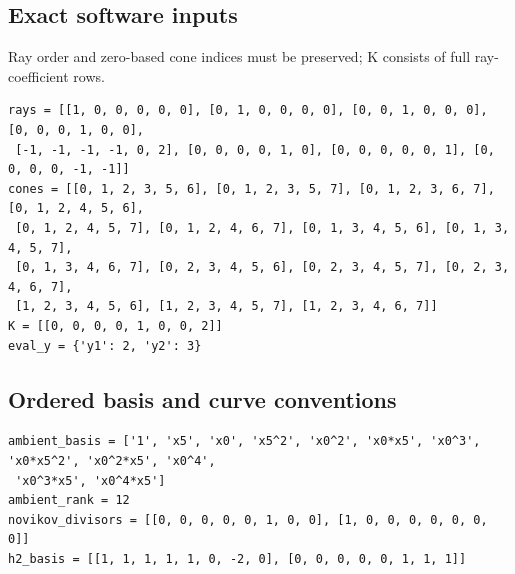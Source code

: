 \documentclass[10pt,a4paper]{article}
\begin{document}
\subsection*{Exact software inputs}
Ray order and zero-based cone indices must be preserved; K consists of full ray-coefficient rows.
\begin{lstlisting}
rays = [[1, 0, 0, 0, 0, 0], [0, 1, 0, 0, 0, 0], [0, 0, 1, 0, 0, 0], [0, 0, 0, 1, 0, 0],
 [-1, -1, -1, -1, 0, 2], [0, 0, 0, 0, 1, 0], [0, 0, 0, 0, 0, 1], [0, 0, 0, 0, -1, -1]]
cones = [[0, 1, 2, 3, 5, 6], [0, 1, 2, 3, 5, 7], [0, 1, 2, 3, 6, 7], [0, 1, 2, 4, 5, 6],
 [0, 1, 2, 4, 5, 7], [0, 1, 2, 4, 6, 7], [0, 1, 3, 4, 5, 6], [0, 1, 3, 4, 5, 7],
 [0, 1, 3, 4, 6, 7], [0, 2, 3, 4, 5, 6], [0, 2, 3, 4, 5, 7], [0, 2, 3, 4, 6, 7],
 [1, 2, 3, 4, 5, 6], [1, 2, 3, 4, 5, 7], [1, 2, 3, 4, 6, 7]]
K = [[0, 0, 0, 0, 1, 0, 0, 2]]
eval_y = {'y1': 2, 'y2': 3}
\end{lstlisting}
\subsection*{Ordered basis and curve conventions}
\begin{lstlisting}
ambient_basis = ['1', 'x5', 'x0', 'x5^2', 'x0^2', 'x0*x5', 'x0^3', 'x0*x5^2', 'x0^2*x5', 'x0^4',
 'x0^3*x5', 'x0^4*x5']
ambient_rank = 12
novikov_divisors = [[0, 0, 0, 0, 0, 1, 0, 0], [1, 0, 0, 0, 0, 0, 0, 0]]
h2_basis = [[1, 1, 1, 1, 1, 0, -2, 0], [0, 0, 0, 0, 0, 1, 1, 1]]
\end{lstlisting}
\end{document}
